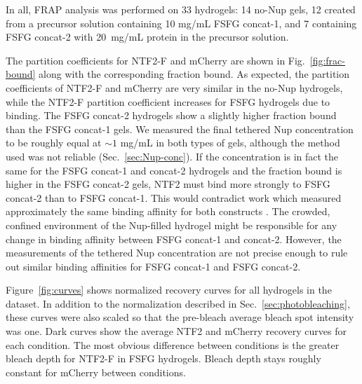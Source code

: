 In all, FRAP analysis was performed on 33 hydrogels: 14 no-Nup gels, 12 created from a precursor solution containing 10 mg/mL FSFG concat-1, and 7 containing FSFG concat-2 with 20~mg/mL protein in the precursor solution. %

The partition coefficients for NTF2-F and mCherry are shown in Fig.~\ref{fig:frac-bound} along with the corresponding fraction bound.  As expected, the partition coefficients of NTF2-F and mCherry are very similar in the no-Nup hydrogels, while the NTF2-F partition coefficient increases for FSFG hydrogels due to binding.  The FSFG concat-2 hydrogels show a slightly higher fraction bound than the FSFG concat-1 gels.  We measured the final tethered Nup concentration to be roughly equal  at $\sim 1$ mg/mL in both types of gels, although the method used was not reliable (Sec.~\ref{sec:Nup-conc}).  If the concentration is in fact the same for the FSFG concat-1 and concat-2 hydrogels and the fraction bound is higher in the FSFG concat-2 gels, NTF2 must bind more strongly to FSFG concat-2 than to FSFG concat-1.  This would contradict work which measured approximately the same binding affinity for both constructs \cite{hayama18}.  The crowded, confined environment of the Nup-filled hydrogel might be responsible for any change in binding affinity between FSFG concat-1 and concat-2.  However, the measurements of the tethered Nup concentration are not precise enough to rule out similar binding affinities for FSFG concat-1 and FSFG concat-2.

Figure~\ref{fig:curves} shows normalized recovery curves for all hydrogels in the dataset.  In addition to the normalization described in Sec.~\ref{sec:photobleaching}, these curves were also scaled so that the pre-bleach average bleach spot intensity was one.  Dark curves show the average NTF2 and mCherry recovery curves for each condition.  The most obvious difference between conditions is the greater bleach depth for NTF2-F in FSFG hydrogels.  Bleach depth stays roughly constant for mCherry between conditions.

